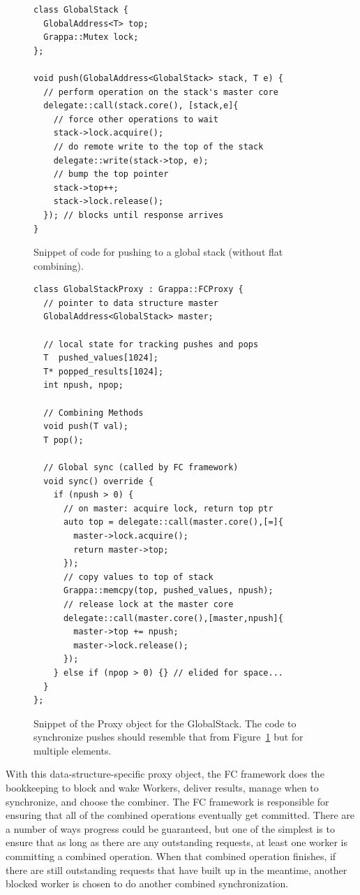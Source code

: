 \begin{figure}[t]
\centering
\begin{lstlisting}[style=grappa]
class GlobalStack {
  GlobalAddress<T> top;
  Grappa::Mutex lock;
};

void push(GlobalAddress<GlobalStack> stack, T e) {
  // perform operation on the stack's master core
  delegate::call(stack.core(), [stack,e]{
    // force other operations to wait
    stack->lock.acquire();
    // do remote write to the top of the stack
    delegate::write(stack->top, e);
    // bump the top pointer
    stack->top++;
    stack->lock.release();
  }); // blocks until response arrives
}
\end{lstlisting}
\caption{Snippet of code for pushing to a global stack (without flat combining).}
\label{fig:push}
\end{figure}

\begin{figure}[t]
\centering
\begin{lstlisting}[style=grappa]
class GlobalStackProxy : Grappa::FCProxy {
  // pointer to data structure master
  GlobalAddress<GlobalStack> master;
  
  // local state for tracking pushes and pops
  T  pushed_values[1024];
  T* popped_results[1024];
  int npush, npop;

  // Combining Methods 
  void push(T val);
  T pop();
  
  // Global sync (called by FC framework)
  void sync() override {
    if (npush > 0) {
      // on master: acquire lock, return top ptr
      auto top = delegate::call(master.core(),[=]{
        master->lock.acquire();
        return master->top;
      });
      // copy values to top of stack
      Grappa::memcpy(top, pushed_values, npush);
      // release lock at the master core
      delegate::call(master.core(),[master,npush]{
        master->top += npush;
        master->lock.release();
      });
    } else if (npop > 0) {} // elided for space...
  }
};
\end{lstlisting}
\caption{Snippet of the Proxy object for the GlobalStack. The code to synchronize pushes should resemble that from Figure~\ref{fig:push} but for multiple elements.}
\label{fig:proxy}
\end{figure}

With this data-structure-specific proxy object, the FC framework does the bookkeeping to block and wake Workers, deliver results, manage when to synchronize, and choose the combiner.
The FC framework is responsible for ensuring that all of the combined operations eventually get committed. There are a number of ways progress could be guaranteed, but one of the simplest is to ensure that as long as there are any outstanding requests, at least one worker is committing a combined operation.
When that combined operation finishes, if there are still outstanding requests that have built up in the meantime, another blocked worker is chosen to do another combined synchronization.

